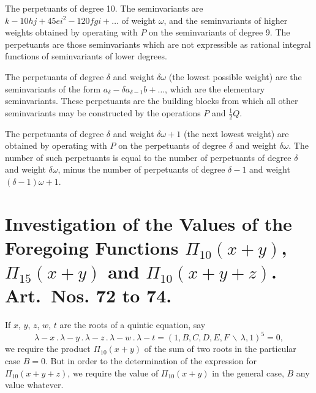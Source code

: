 \documentclass[11pt,a4paper]{book}
\begin{document}
\setcounter{art}{69}
\begin{art}
The perpetuants of degree 10. The seminvariants are $k - 10hj + 45ei^{2} - 120fgi + \ldots$ of weight $\omega$, and the seminvariants of higher weights obtained by operating with $P$ on the seminvariants of degree 9. The perpetuants are those seminvariants which are not expressible as rational integral functions of seminvariants of lower degrees.
\end{art}

\setcounter{art}{70}
\begin{art}
The perpetuants of degree $\delta$ and weight $\delta\omega$ (the lowest possible weight) are the seminvariants of the form $a_{\delta} - \delta a_{\delta - 1}b + \ldots$, which are the elementary seminvariants. These perpetuants are the building blocks from which all other seminvariants may be constructed by the operations $P$ and $\frac{1}{2}Q$.
\end{art}

\setcounter{art}{71}
\begin{art}
The perpetuants of degree $\delta$ and weight $\delta\omega + 1$ (the next lowest weight) are obtained by operating with $P$ on the perpetuants of degree $\delta$ and weight $\delta\omega$. The number of such perpetuants is equal to the number of perpetuants of degree $\delta$ and weight $\delta\omega$, minus the number of perpetuants of degree $\delta - 1$ and weight $(\delta - 1)\omega + 1$.
\end{art}

\section*{Investigation of the Values of the Foregoing Functions $\Pi_{10}(x + y)$, $\Pi_{15}(x + y)$ and $\Pi_{10}(x + y + z)$. Art.~Nos. \textbf{72} to \textbf{74}.}

\setcounter{art}{71}
\begin{art}
If $x$, $y$, $z$, $w$, $t$ are the roots of a quintic equation, say
\[
\lambda - x\,.\,\lambda - y\,.\,\lambda - z\,.\,\lambda - w\,.\,\lambda - t = (1, B, C, D, E, F\,\backslash\,\lambda, 1)^{5} = 0,
\]
we require the product $\Pi_{10}(x + y)$ of the sum of two roots in the particular case $B = 0$. But in order to the determination of the expression for $\Pi_{10}(x + y + z)$, we require the value of $\Pi_{10}(x + y)$ in the general case, $B$ any value whatever.
\end{art}
\end{document}
